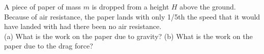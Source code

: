 A piece of paper of mass $m$ is dropped from a height $H$ above the
ground. Because of air resistance, the paper lands with only 1/5th
the speed that it would have landed with had there been no air
resistance.\\
%
(a) What is the work on the paper due to gravity?\answercheck\hwendpart
%
(b) What is the work on the paper due to the drag force?\answercheck
